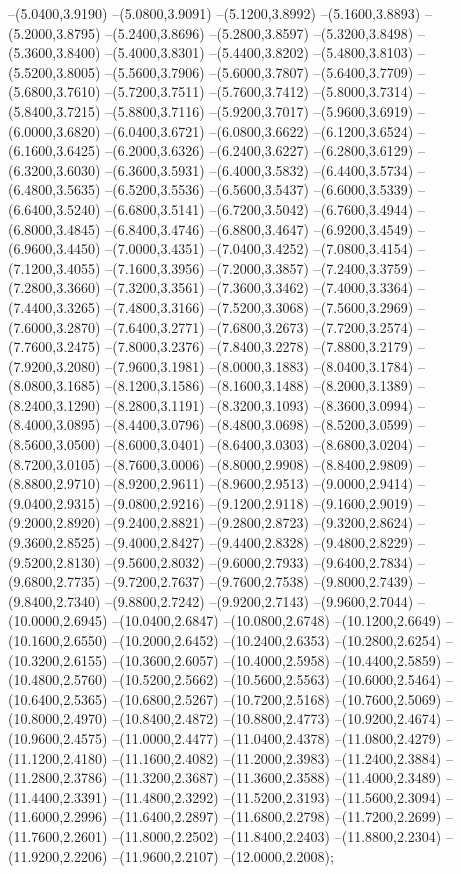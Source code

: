{	--(5.0400,3.9190)
	--(5.0800,3.9091)
	--(5.1200,3.8992)
	--(5.1600,3.8893)
	--(5.2000,3.8795)
	--(5.2400,3.8696)
	--(5.2800,3.8597)
	--(5.3200,3.8498)
	--(5.3600,3.8400)
	--(5.4000,3.8301)
	--(5.4400,3.8202)
	--(5.4800,3.8103)
	--(5.5200,3.8005)
	--(5.5600,3.7906)
	--(5.6000,3.7807)
	--(5.6400,3.7709)
	--(5.6800,3.7610)
	--(5.7200,3.7511)
	--(5.7600,3.7412)
	--(5.8000,3.7314)
	--(5.8400,3.7215)
	--(5.8800,3.7116)
	--(5.9200,3.7017)
	--(5.9600,3.6919)
	--(6.0000,3.6820)
	--(6.0400,3.6721)
	--(6.0800,3.6622)
	--(6.1200,3.6524)
	--(6.1600,3.6425)
	--(6.2000,3.6326)
	--(6.2400,3.6227)
	--(6.2800,3.6129)
	--(6.3200,3.6030)
	--(6.3600,3.5931)
	--(6.4000,3.5832)
	--(6.4400,3.5734)
	--(6.4800,3.5635)
	--(6.5200,3.5536)
	--(6.5600,3.5437)
	--(6.6000,3.5339)
	--(6.6400,3.5240)
	--(6.6800,3.5141)
	--(6.7200,3.5042)
	--(6.7600,3.4944)
	--(6.8000,3.4845)
	--(6.8400,3.4746)
	--(6.8800,3.4647)
	--(6.9200,3.4549)
	--(6.9600,3.4450)
	--(7.0000,3.4351)
	--(7.0400,3.4252)
	--(7.0800,3.4154)
	--(7.1200,3.4055)
	--(7.1600,3.3956)
	--(7.2000,3.3857)
	--(7.2400,3.3759)
	--(7.2800,3.3660)
	--(7.3200,3.3561)
	--(7.3600,3.3462)
	--(7.4000,3.3364)
	--(7.4400,3.3265)
	--(7.4800,3.3166)
	--(7.5200,3.3068)
	--(7.5600,3.2969)
	--(7.6000,3.2870)
	--(7.6400,3.2771)
	--(7.6800,3.2673)
	--(7.7200,3.2574)
	--(7.7600,3.2475)
	--(7.8000,3.2376)
	--(7.8400,3.2278)
	--(7.8800,3.2179)
	--(7.9200,3.2080)
	--(7.9600,3.1981)
	--(8.0000,3.1883)
	--(8.0400,3.1784)
	--(8.0800,3.1685)
	--(8.1200,3.1586)
	--(8.1600,3.1488)
	--(8.2000,3.1389)
	--(8.2400,3.1290)
	--(8.2800,3.1191)
	--(8.3200,3.1093)
	--(8.3600,3.0994)
	--(8.4000,3.0895)
	--(8.4400,3.0796)
	--(8.4800,3.0698)
	--(8.5200,3.0599)
	--(8.5600,3.0500)
	--(8.6000,3.0401)
	--(8.6400,3.0303)
	--(8.6800,3.0204)
	--(8.7200,3.0105)
	--(8.7600,3.0006)
	--(8.8000,2.9908)
	--(8.8400,2.9809)
	--(8.8800,2.9710)
	--(8.9200,2.9611)
	--(8.9600,2.9513)
	--(9.0000,2.9414)
	--(9.0400,2.9315)
	--(9.0800,2.9216)
	--(9.1200,2.9118)
	--(9.1600,2.9019)
	--(9.2000,2.8920)
	--(9.2400,2.8821)
	--(9.2800,2.8723)
	--(9.3200,2.8624)
	--(9.3600,2.8525)
	--(9.4000,2.8427)
	--(9.4400,2.8328)
	--(9.4800,2.8229)
	--(9.5200,2.8130)
	--(9.5600,2.8032)
	--(9.6000,2.7933)
	--(9.6400,2.7834)
	--(9.6800,2.7735)
	--(9.7200,2.7637)
	--(9.7600,2.7538)
	--(9.8000,2.7439)
	--(9.8400,2.7340)
	--(9.8800,2.7242)
	--(9.9200,2.7143)
	--(9.9600,2.7044)
	--(10.0000,2.6945)
	--(10.0400,2.6847)
	--(10.0800,2.6748)
	--(10.1200,2.6649)
	--(10.1600,2.6550)
	--(10.2000,2.6452)
	--(10.2400,2.6353)
	--(10.2800,2.6254)
	--(10.3200,2.6155)
	--(10.3600,2.6057)
	--(10.4000,2.5958)
	--(10.4400,2.5859)
	--(10.4800,2.5760)
	--(10.5200,2.5662)
	--(10.5600,2.5563)
	--(10.6000,2.5464)
	--(10.6400,2.5365)
	--(10.6800,2.5267)
	--(10.7200,2.5168)
	--(10.7600,2.5069)
	--(10.8000,2.4970)
	--(10.8400,2.4872)
	--(10.8800,2.4773)
	--(10.9200,2.4674)
	--(10.9600,2.4575)
	--(11.0000,2.4477)
	--(11.0400,2.4378)
	--(11.0800,2.4279)
	--(11.1200,2.4180)
	--(11.1600,2.4082)
	--(11.2000,2.3983)
	--(11.2400,2.3884)
	--(11.2800,2.3786)
	--(11.3200,2.3687)
	--(11.3600,2.3588)
	--(11.4000,2.3489)
	--(11.4400,2.3391)
	--(11.4800,2.3292)
	--(11.5200,2.3193)
	--(11.5600,2.3094)
	--(11.6000,2.2996)
	--(11.6400,2.2897)
	--(11.6800,2.2798)
	--(11.7200,2.2699)
	--(11.7600,2.2601)
	--(11.8000,2.2502)
	--(11.8400,2.2403)
	--(11.8800,2.2304)
	--(11.9200,2.2206)
	--(11.9600,2.2107)
	--(12.0000,2.2008);
}
